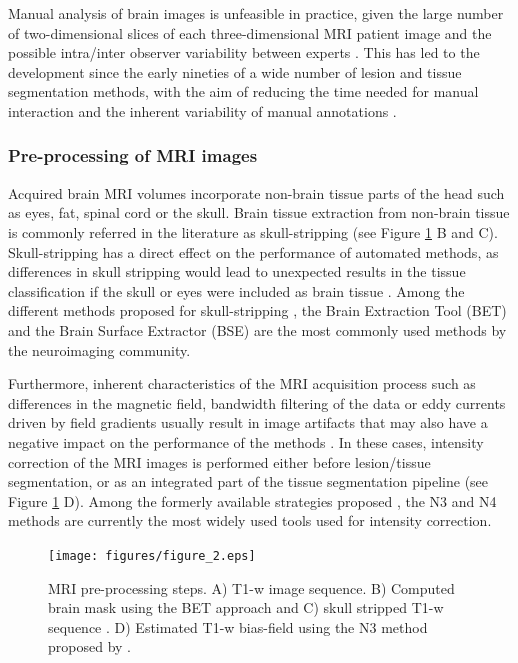 Manual analysis of brain images is unfeasible in practice, given the large number of two-dimensional slices of each three-dimensional MRI patient image and the possible intra/inter observer variability between experts \cite{Cabezas2011}. This has led to the development since the early nineties of a wide number of lesion and tissue segmentation methods, with the aim of reducing the time needed for  manual interaction and the inherent variability of manual annotations \cite{Cline1990, Gerig1992, Kapur1996}. 


\subsubsection{Pre-processing of MRI images}
Acquired brain MRI volumes incorporate non-brain tissue parts of the head such as eyes, fat, spinal cord or the skull. Brain tissue extraction from non-brain tissue is commonly referred in the literature as skull-stripping (see Figure \ref{preprocessing_mri} B and C). Skull-stripping has a direct effect on the performance of automated methods, as differences in skull stripping would lead to unexpected results in the tissue classification if the skull or eyes were included as brain tissue \cite{Acosta-Cabronero2008, Popescu2012}. Among the different methods proposed for skull-stripping \cite{Acosta-Cabronero2008, Lee2003, Roura2014}, the Brain Extraction Tool (BET) \cite{Smith2002} and the Brain Surface Extractor (BSE) \cite{Shattuck2001} are the most commonly used methods by the neuroimaging community.

Furthermore, inherent characteristics of the MRI acquisition process such as differences in the magnetic field, bandwidth filtering of the data or eddy currents driven by field gradients usually result in image artifacts that may also have a negative impact on the performance of the methods \cite{Simmons1994}. In these cases, intensity correction of the MRI images is performed either before lesion/tissue segmentation, or as an integrated part of the tissue segmentation pipeline  (see Figure \ref{preprocessing_mri} D). Among the formerly available strategies proposed \cite{Arnold2001,Hou2006}, the N3 \cite{Sled1998} and N4 \cite{Tustison2010} methods are currently the most widely used tools used for intensity correction. 


\begin{figure}[top]
  \begin{center}
    \texttt{[image: figures/figure\_2.eps]}
  \end{center}
    \caption[MRI pre-processing steps]{MRI pre-processing steps. A) T1-w image sequence. B) Computed brain mask using the BET approach \cite{Smith2002} and C) skull stripped T1-w sequence  . D) Estimated T1-w bias-field using the N3 method proposed by \cite{Sled1998}.}
    \label{preprocessing_mri}
\end{figure}

